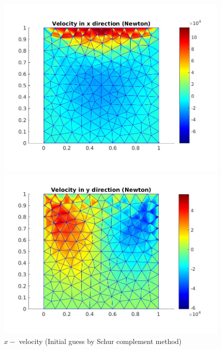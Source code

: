 \documentclass[a4paper]{book}
\begin{document}
\begin{figure}
  \begin{minipage}[c]{0.67\textwidth}
    \includegraphics[width=\textwidth]{lid_newton_vx_schur.jpg}
  \end{minipage}\hfill
  \begin{minipage}[c]{0.3\textwidth}
    \caption{$x-$ velocity (Initial guess by Schur complement method)}
  \label{x_vel_navier_stoke_schur_lid}
  \end{minipage}
  \begin{minipage}[c]{0.67\textwidth}
    \includegraphics[width=\textwidth]{lid_newton_vy_schur.jpg}
  \end{minipage}\hfill

\end{figure}
\end{document}
